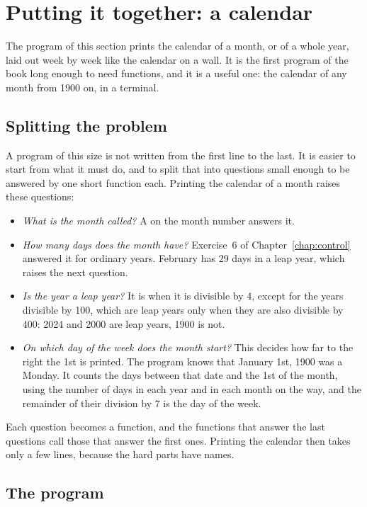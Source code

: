 \vfill\pagebreak
\section{Putting it together: a calendar}
\label{sec:functions:calendar}

The program of this section prints the calendar of a month, or of a whole year,
laid out week by week like the calendar on a wall. It is the first program of the
book long enough to need functions, and it is a useful one: the calendar of any
month from 1900 on, in a terminal.

\subsection{Splitting the problem}

A program of this size is not written from the first line to the last. It is
easier to start from what it must do, and to split that into questions small
enough to be answered by one short function each. Printing the calendar of a
month raises these questions:

\begin{itemize}
\item \textit{What is the month called?} A  on the month number
  answers it.
\item \textit{How many days does the month have?} Exercise~6 of
  Chapter~\ref{chap:control} answered it for ordinary years. February has 29 days
  in a leap year, which raises the next question.
\item \textit{Is the year a leap year?} It is when it is divisible by 4, except
  for the years divisible by 100, which are leap years only when they are also
  divisible by 400: 2024 and 2000 are leap years, 1900 is not.
\item \textit{On which day of the week does the month start?} This decides how
  far to the right the 1st is printed. The program knows that January 1st, 1900
  was a Monday. It counts the days between that date and the 1st of the month,
  using the number of days in each year and in each month on the way, and the
  remainder of their division by 7 is the day of the week.
\end{itemize}

Each question becomes a function, and the functions that answer the last
questions call those that answer the first ones. Printing the calendar then
takes only a few lines, because the hard parts have names.

\subsection{The program}

